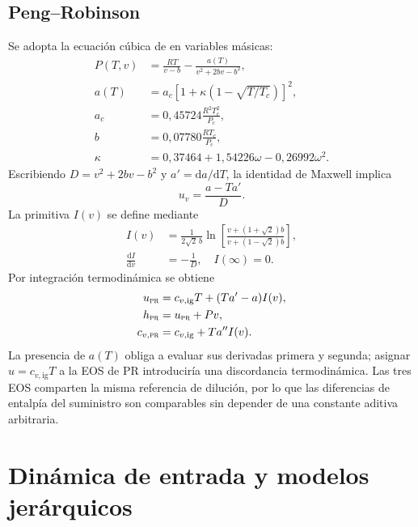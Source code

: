 \documentclass[11pt,letterpaper]{article}
\newcommand{\dd}{\mathrm{d}}
\newcommand{\PR}{\textsc{pr}}
\begin{document}
\subsection{Peng--Robinson}
Se adopta la ecuación cúbica de \citet{Peng1976} en variables másicas:
\begin{align}
P(T,v)&=\frac{RT}{v-b}-\frac{a(T)}{v^2+2bv-b^2},\label{eq:pr}\\
a(T)&=a_c\left[1+\kappa(1-\sqrt{T/T_c})\right]^2,\nonumber\\
a_c&=0,45724\frac{R^2T_c^2}{P_c},\nonumber\\
b&=0,07780\frac{RT_c}{P_c},\nonumber\\
\kappa&=0,37464+1,54226\omega-0,26992\omega^2.\nonumber
\end{align}
Escribiendo $D=v^2+2bv-b^2$ y $a'=\dd a/\dd T$, la identidad de Maxwell implica
\begin{equation}
u_v=\frac{a-Ta'}{D}.\label{eq:pruv}
\end{equation}
La primitiva $I(v)$ se define mediante
\begin{align}
I(v)&=\frac{1}{2\sqrt 2\,b}\ln\left[\frac{v+(1+\sqrt 2)b}{v+(1-\sqrt 2)b}\right],\label{eq:Iv}\\
\frac{\dd I}{\dd v}&=-\frac{1}{D},\quad I(\infty)=0.\nonumber
\end{align}
Por integración termodinámica se obtiene
\begin{align}
u_{\PR}&=c_{v,\mathrm{ig}}T+(Ta'-a)I(v),\\
h_{\PR}&=u_{\PR}+Pv,\\
c_{v,\PR}&=c_{v,\mathrm{ig}}+Ta''I(v).\label{eq:pru}
\end{align}
La presencia de $a(T)$ obliga a evaluar sus derivadas primera y segunda; asignar $u=c_{v,\mathrm{ig}}T$ a la EOS de PR introduciría una discordancia termodinámica. Las tres EOS comparten la misma referencia de dilución, por lo que las diferencias de entalpía del suministro son comparables sin depender de una constante aditiva arbitraria.

\section{Dinámica de entrada y modelos jerárquicos}
\end{document}
